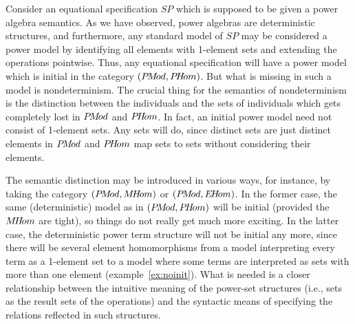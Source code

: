 {Consider an equational specification $SP$ which is supposed to be 
given a power algebra semantics. As 
we have observed, power algebras are deterministic structures, 
and furthermore, any standard model of $SP$ 
may be considered a power model by identifying all elements with 1-element 
sets and extending the 
operations pointwise. Thus, any equational specification will have 
a power model which is initial in the 
category $(P\!M\!od,P\!H\!om)$. But what is missing in such a model is nondeterminism. 
The crucial thing for the 
semantics of nondeterminism is the distinction between the 
individuals and the sets of individuals which 
gets completely lost in $P\!M\!od$ and $P\!H\!om$. In fact, an initial power model need 
not consist of 1-element 
sets. Any sets will do, since distinct sets are just distinct 
elements in $P\!M\!od$ and $P\!H\!om$ map sets to sets 
without considering their elements. 

The semantic distinction may be introduced in various ways, for instance, 
by taking the category $(P\!M\!od,M\!H\!om)$ 
or $(P\!M\!od,E\!H\!om)$. In the former case, the same (deterministic) model as in 
$(P\!M\!od,P\!H\!om)$ will be initial  
(provided the $M\!H\!om$ are tight), so things do not really get much more 
exciting. In the latter case, the 
deterministic power term structure will not be initial any more, since 
there will be several element 
homomorphisms from a model interpreting every term as a 
1-element set to a model where some terms 
are interpreted as sets with more than one element (example~\ref{ex:noinit}).
What is needed is a closer relationship between the intuitive meaning of the power-set structures (i.e., 
sets as the result sets of the operations) and the syntactic means of specifying the relations reflected in such 
structures.  

}
